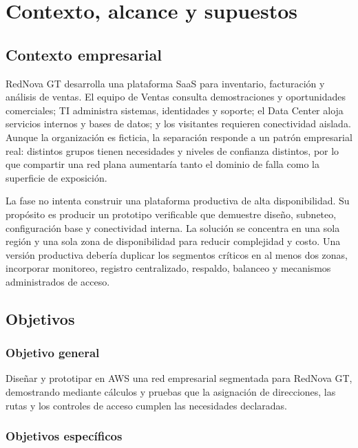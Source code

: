\chapter{Contexto, alcance y supuestos}

\section{Contexto empresarial}

RedNova GT desarrolla una plataforma SaaS para inventario, facturación y análisis de ventas. El equipo de Ventas consulta demostraciones y oportunidades comerciales; TI administra sistemas, identidades y soporte; el Data Center aloja servicios internos y bases de datos; y los visitantes requieren conectividad aislada. Aunque la organización es ficticia, la separación responde a un patrón empresarial real: distintos grupos tienen necesidades y niveles de confianza distintos, por lo que compartir una red plana aumentaría tanto el dominio de falla como la superficie de exposición.

La fase no intenta construir una plataforma productiva de alta disponibilidad. Su propósito es producir un prototipo verificable que demuestre diseño, subneteo, configuración base y conectividad interna. La solución se concentra en una sola región y una sola zona de disponibilidad para reducir complejidad y costo. Una versión productiva debería duplicar los segmentos críticos en al menos dos zonas, incorporar monitoreo, registro centralizado, respaldo, balanceo y mecanismos administrados de acceso.

\section{Objetivos}

\subsection{Objetivo general}

Diseñar y prototipar en AWS una red empresarial segmentada para RedNova GT, demostrando mediante cálculos y pruebas que la asignación de direcciones, las rutas y los controles de acceso cumplen las necesidades declaradas.

\subsection{Objetivos específicos}


